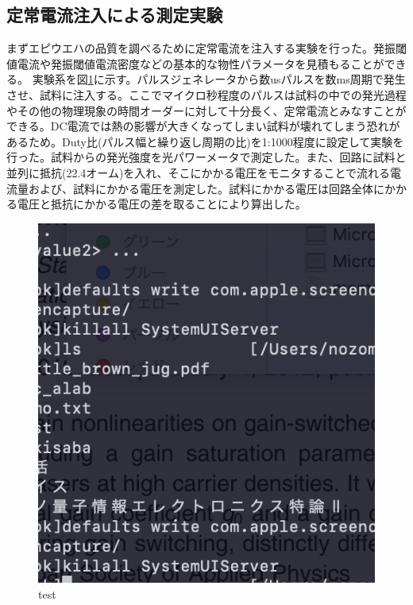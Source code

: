 \subsection{定常電流注入による測定実験}
まずエピウエハの品質を調べるために定常電流を注入する実験を行った。発振閾値電流や発振閾値電流密度などの基本的な物性パラメータを見積もることができる。
実験系を図\ref{fig:IL}に示す。パルスジェネレータから数usパルスを数ms周期で発生させ、試料に注入する。ここでマイクロ秒程度のパルスは試料の中での発光過程やその他の物理現象の時間オーダーに対して十分長く、定常電流とみなすことができる。DC電流では熱の影響が大きくなってしまい試料が壊れてしまう恐れがあるため。Duty比(パルス幅と繰り返し周期の比)を1:1000程度に設定して実験を行った。試料からの発光強度を光パワーメータで測定した。また、回路に試料と並列に抵抗(22.4オーム)を入れ、そこにかかる電圧をモニタすることで流れる電流量および、試料にかかる電圧を測定した。試料にかかる電圧は回路全体にかかる電圧と抵抗にかかる電圧の差を取ることにより算出した。
\begin{figure}[htbp]
	\includegraphics[width=15cm]{test_fig.png}
	\caption{test}
	\label{fig:IL}
\end{figure}
